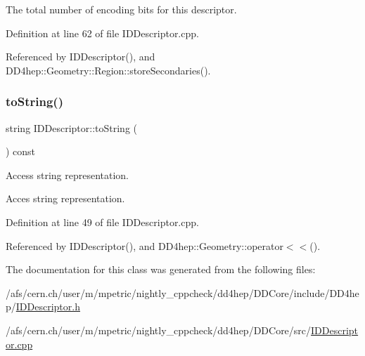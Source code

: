 The total number of encoding bits for this descriptor. 



Definition at line 62 of file I\+D\+Descriptor.\+cpp.



Referenced by I\+D\+Descriptor(), and D\+D4hep\+::\+Geometry\+::\+Region\+::store\+Secondaries().

\hypertarget{class_d_d4hep_1_1_geometry_1_1_i_d_descriptor_a0e4113ffe3560b7cef6da4e880d827f3}{}\label{class_d_d4hep_1_1_geometry_1_1_i_d_descriptor_a0e4113ffe3560b7cef6da4e880d827f3} 
\subsubsection{\texorpdfstring{to\+String()}{toString()}}
{\footnotesize\ttfamily string I\+D\+Descriptor\+::to\+String (\begin{DoxyParamCaption}{ }\end{DoxyParamCaption}) const}



Access string representation. 

Acces string representation. 

Definition at line 49 of file I\+D\+Descriptor.\+cpp.



Referenced by I\+D\+Descriptor(), and D\+D4hep\+::\+Geometry\+::operator$<$$<$().



The documentation for this class was generated from the following files\+:\begin{DoxyCompactItemize}
\item 
/afs/cern.\+ch/user/m/mpetric/nightly\+\_\+cppcheck/dd4hep/\+D\+D\+Core/include/\+D\+D4hep/\hyperlink{_i_d_descriptor_8h}{I\+D\+Descriptor.\+h}\item 
/afs/cern.\+ch/user/m/mpetric/nightly\+\_\+cppcheck/dd4hep/\+D\+D\+Core/src/\hyperlink{_i_d_descriptor_8cpp}{I\+D\+Descriptor.\+cpp}\end{DoxyCompactItemize}
